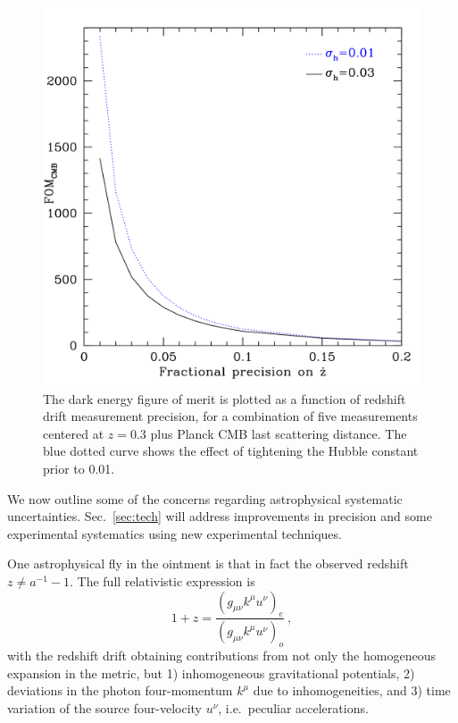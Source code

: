 \documentclass[preprint2, 10pt]{aastex}
\newcommand{\be}{\begin{equation}}
\newcommand{\ee}{\end{equation}}
\begin{document}
\begin{figure}[!htbp] 
   \centering
  \includegraphics[width=\columnwidth]{fomprec.pdf}
\caption{The dark energy figure of merit is plotted as a function of 
redshift drift measurement precision, for a combination of five measurements 
centered at $z=0.3$ plus Planck CMB last scattering distance. The blue 
dotted curve shows the effect of tightening the Hubble constant prior to 
0.01. 
} 
\label{fig:fomprec} 
\end{figure}


We now outline 
some of the 
concerns regarding astrophysical systematic uncertainties. Sec.~\ref{sec:tech} 
will address improvements in precision and some experimental systematics 
using new experimental techniques. 

One astrophysical fly in the ointment is that in fact the observed redshift 
$z\ne a^{-1}-1$. The full relativistic expression is 
\be 
1+z=\frac{(g_{\mu\nu}k^\mu u^\nu)_e}{(g_{\mu\nu}k^\mu u^\nu)_o}\ , 
\label{eq:zgen} 
\ee 
with the redshift drift obtaining contributions from not only the 
homogeneous expansion in the metric, but 1) inhomogeneous gravitational 
potentials, 2) deviations in the photon four-momentum $k^\mu$ due to 
inhomogeneities, and 3) time variation of the source four-velocity $u^\nu$, 
i.e.\ peculiar accelerations.  
\end{document}
